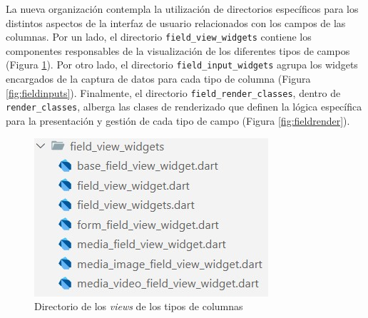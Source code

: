 \documentclass{article}
\begin{document}
La nueva organización contempla la utilización de directorios específicos para los distintos aspectos de la interfaz de usuario relacionados con los campos de las columnas. Por un lado, el directorio \texttt{field\_view\_widgets} contiene los componentes responsables de la visualización de los diferentes tipos de campos (Figura \ref{fig:fieldviews}). Por otro lado, el directorio \texttt{field\_input\_widgets} agrupa los widgets encargados de la captura de datos para cada tipo de columna (Figura \ref{fig:fieldinputs}). Finalmente, el directorio \texttt{field\_render\_classes}, dentro de \texttt{render\_classes}, alberga las clases de renderizado que definen la lógica específica para la presentación y gestión de cada tipo de campo (Figura \ref{fig:fieldrender}).

\begin{figure}[H]
  \centering
  \begin{minipage}[b]{0.3\textwidth}
    \centering
    \includegraphics[width=\textwidth]{images/field_views.jpg}
    \caption{Directorio de los \textit{views} de los tipos de columnas}
    \label{fig:fieldviews}
  \end{minipage}
  \hspace{0.02\textwidth}
  \begin{minipage}[b]{0.3\textwidth}
    \centering

\end{minipage}
\end{figure}
\end{document}
